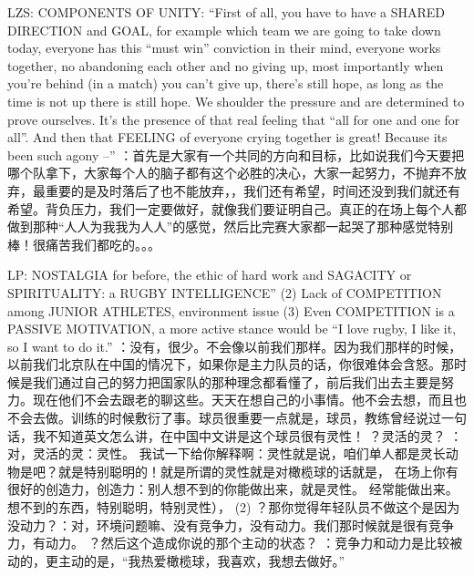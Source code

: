 \begin{CJK}{UTF8}{gbsn}
        LZS:
         COMPONENTS OF UNITY: “First of all, you have to have a SHARED DIRECTION and GOAL, for example which team we are going to take down today, everyone has this “must win” conviction in their mind, everyone works together, no abandoning each other and no giving up, most importantly when you’re behind (in a match) you can’t give up, there’s still hope, as long as the time is not up there is still hope.  We shoulder the pressure and are determined to prove ourselves.  It's the presence of that real feeling that “all for one and one for all”.  And then that FEELING of everyone crying together is great! Because its been such agony –”	：首先是大家有一个共同的方向和目标，比如说我们今天要把哪个队拿下，大家每个人的脑子都有这个必胜的决心，大家一起努力，不抛弃不放弃，最重要的是及时落后了也不能放弃，，我们还有希望，时间还没到我们就还有希望。背负压力，我们一定要做好，就像我们要证明自己。真正的在场上每个人都做到那种“人人为我我为人人”的感觉，然后比完赛大家都一起哭了那种感觉特别棒！很痛苦我们都吃的。。。






              LP: NOSTALGIA for before, the ethic of hard work and SAGACITY or SPIRITUALITY: a RUGBY INTELLIGENCE” (2) Lack of COMPETITION among JUNIOR ATHLETES, environment issue (3) Even COMPETITION is a PASSIVE MOTIVATION, a more active stance would be “I love rugby, I like it, so I want to do it.”	：没有，很少。不会像以前我们那样。因为我们那样的时候，以前我们北京队在中国的情况下，如果你是主力队员的话，你很难体会含怒。那时候是我们通过自己的努力把国家队的那种理念都看懂了，前后我们出去主要是努力。现在他们不会去跟老的聊这些。天天在想自己的小事情。他不会去想，而且也不会去做。训练的时候敷衍了事。球员很重要一点就是，球员，教练曾经说过一句话，我不知道英文怎么讲，在中国中文讲是这个球员很有灵性！
              ？灵活的灵？
              ：对，灵活的灵：灵性。 我试一下给你解释啊：灵性就是说，咱们单人都是灵长动物是吧？就是特别聪明的！就是所谓的灵性就是对橄榄球的话就是， 在场上你有很好的创造力，创造力：别人想不到的你能做出来，就是灵性。 经常能做出来。 想不到的东西，特别聪明，特别灵性），
              (2) ？那你觉得年轻队员不做这个是因为没动力？：对，环境问题嘛、没有竞争力，没有动力。我们那时候就是很有竞争力，有动力。
              ？然后这个造成你说的那个主动的状态？
              ：竞争力和动力是比较被动的，更主动的是，“我热爱橄榄球，我喜欢，我想去做好。”



\end{CJK}
